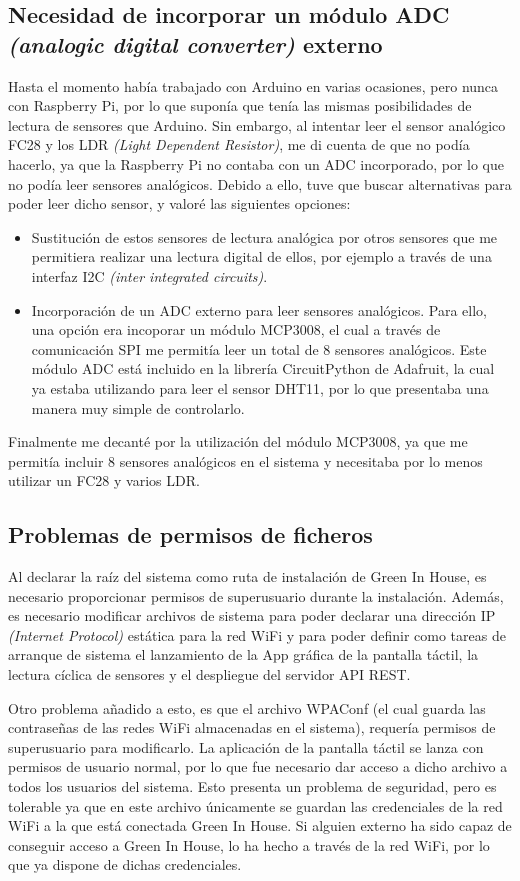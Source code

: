     \subsection{Necesidad de incorporar un módulo ADC \textit{(analogic digital converter)} externo}
    Hasta el momento había trabajado con Arduino en varias ocasiones, pero nunca con Raspberry Pi, por lo que suponía que tenía las mismas posibilidades de lectura de sensores que Arduino. Sin embargo, al intentar leer el sensor analógico FC28 y los LDR \textit{(Light Dependent Resistor)}, me di cuenta de que no podía hacerlo, ya que la Raspberry Pi no contaba con un ADC incorporado, por lo que no podía leer sensores analógicos. Debido a ello, tuve que buscar alternativas para poder leer dicho sensor, y valoré las siguientes opciones:
    \begin{itemize}
        \item Sustitución de estos sensores de lectura analógica por otros sensores que me permitiera realizar una lectura digital de ellos, por ejemplo a través de una interfaz I2C \textit{(inter integrated circuits)}.
        \item Incorporación de un ADC externo para leer sensores analógicos. Para ello, una opción era incoporar un módulo MCP3008, el cual a través de comunicación SPI me permitía leer un total de 8 sensores analógicos. Este módulo ADC está incluido en la librería CircuitPython de Adafruit, la cual ya estaba utilizando para leer el sensor DHT11, por lo que presentaba una manera muy simple de controlarlo.
    \end{itemize}
    Finalmente me decanté por la utilización del módulo MCP3008, ya que me permitía incluir 8 sensores analógicos en el sistema y necesitaba por lo menos utilizar un FC28 y varios LDR.
    
    \subsection{Problemas de permisos de ficheros}
    Al declarar la raíz del sistema como ruta de instalación de Green In House, es necesario proporcionar permisos de superusuario durante la instalación. Además, es necesario modificar archivos de sistema para poder declarar una dirección IP \textit{(Internet Protocol)} estática para la red WiFi y para poder definir como tareas de arranque de sistema el lanzamiento de la App gráfica de la pantalla táctil, la lectura cíclica de sensores y el despliegue del servidor API REST.
    
    Otro problema añadido a esto, es que el archivo WPAConf (el cual guarda las contraseñas de las redes WiFi almacenadas en el sistema), requería permisos de superusuario para modificarlo. La aplicación de la pantalla táctil se lanza con permisos de usuario normal, por lo que fue necesario dar acceso a dicho archivo a todos los usuarios del sistema. Esto presenta un problema de seguridad, pero es tolerable ya que en este archivo únicamente se guardan las credenciales de la red WiFi a la que está conectada Green In House. Si alguien externo ha sido capaz de conseguir acceso a Green In House, lo ha hecho a través de la red WiFi, por lo que ya dispone de dichas credenciales.

